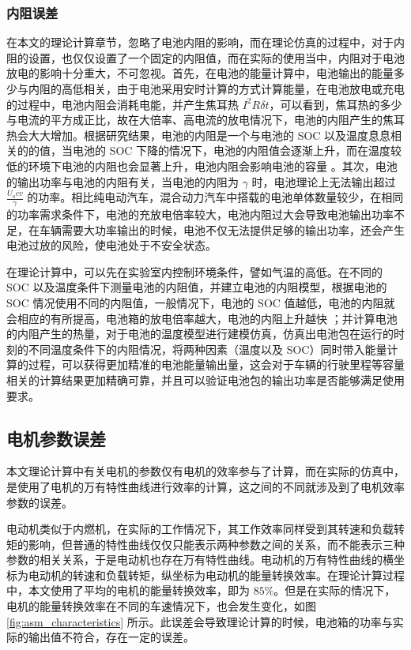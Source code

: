 \subsubsection{内阻误差}
在本文的理论计算章节，忽略了电池内阻的影响，而在理论仿真的过程中，对于内阻的设置，也仅仅设置了一个固定的内阻值，而在实际的使用当中，内阻对于电池放电的影响十分重大，不可忽视。首先，在电池的能量计算中，电池输出的能量多少与内阻的高低相关，由于电池采用安时计算的方式计算能量，在电池放电或充电的过程中，电池内阻会消耗电能，并产生焦耳热 $I^2R \delta t$，可以看到，焦耳热的多少与电流的平方成正比，故在大倍率、高电流的放电情况下，电池的内阻产生的焦耳热会大大增加。根据研究结果，电池的内阻是一个与电池的 SOC 以及温度息息相关的的值，当电池的 SOC 下降的情况下，电池的内阻值会逐渐上升，而在温度较低的环境下电池的内阻也会显著上升，电池内阻会影响电池的容量 \cite{刘伟2016锂离子动力电池直流内阻测试及其应用研究}。其次，电池的输出功率与电池的内阻有关，当电池的内阻为 $\gamma$ 时，电池理论上无法输出超过 $\frac{U_ocv}{\gamma}$ 的功率。相比纯电动汽车，混合动力汽车中搭载的电池单体数量较少，在相同的功率需求条件下，电池的充放电倍率较大，电池内阻过大会导致电池输出功率不足，在车辆需要大功率输出的时候，电池不仅无法提供足够的输出功率，还会产生电池过放的风险，使电池处于不安全状态。

在理论计算中，可以先在实验室内控制环境条件，譬如气温的高低。在不同的 SOC 以及温度条件下测量电池的内阻值，并建立电池的内阻模型，根据电池的 SOC 情况使用不同的内阻值，一般情况下，电池的 SOC 值越低，电池的内阻就会相应的有所提高，电池箱的放电倍率越大，电池的内阻上升越快 \cite{罗玉涛2016延长锂离子电池寿命的电动汽车复合电源设计}；并计算电池的内阻产生的热量，对于电池的温度模型进行建模仿真，仿真出电池包在运行的时刻的不同温度条件下的内阻情况，将两种因素（温度以及 SOC）同时带入能量计算的过程，可以获得更加精准的电池能量输出量，这会对于车辆的行驶里程等容量相关的计算结果更加精确可靠，并且可以验证电池包的输出功率是否能够满足使用要求。

\subsection{电机参数误差}

本文理论计算中有关电机的参数仅有电机的效率参与了计算，而在实际的仿真中，是使用了电机的万有特性曲线进行效率的计算，这之间的不同就涉及到了电机效率参数的误差。

电动机类似于内燃机，在实际的工作情况下，其工作效率同样受到其转速和负载转矩的影响，但普通的特性曲线仅仅只能表示两种参数之间的关系，而不能表示三种参数的相关关系，于是电动机也存在万有特性曲线。电动机的万有特性曲线的横坐标为电动机的转速和负载转矩，纵坐标为电动机的能量转换效率。在理论计算过程中，本文使用了平均的电机的能量转换效率，即为 $85\%$。但是在实际的情况下，电机的能量转换效率在不同的车速情况下，也会发生变化，如图 \ref{fig:asm_characteristics} 所示。此误差会导致理论计算的时候，电池箱的功率与实际的输出值不符合，存在一定的误差。

